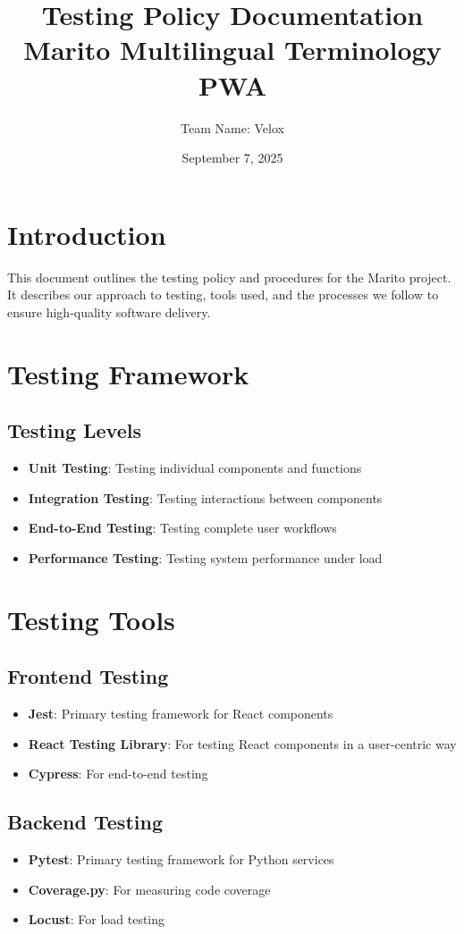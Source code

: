 \documentclass[12pt]{article}
\title{Testing Policy Documentation\\\large\textbf{Marito Multilingual Terminology PWA}}
\author{Team Name: Velox}
\date{September 7, 2025}
\begin{document}
\maketitle
\tableofcontents
\newpage

\section{Introduction}
This document outlines the testing policy and procedures for the Marito project. It describes our approach to testing, tools used, and the processes we follow to ensure high-quality software delivery.

\section{Testing Framework}

\subsection{Testing Levels}
\begin{itemize}
    \item \textbf{Unit Testing}: Testing individual components and functions
    \item \textbf{Integration Testing}: Testing interactions between components
    \item \textbf{End-to-End Testing}: Testing complete user workflows
    \item \textbf{Performance Testing}: Testing system performance under load
\end{itemize}

\section{Testing Tools}

\subsection{Frontend Testing}
\begin{itemize}
    \item \textbf{Jest}: Primary testing framework for React components
    \item \textbf{React Testing Library}: For testing React components in a user-centric way
    \item \textbf{Cypress}: For end-to-end testing
\end{itemize}

\subsection{Backend Testing}
\begin{itemize}
    \item \textbf{Pytest}: Primary testing framework for Python services
    \item \textbf{Coverage.py}: For measuring code coverage
    \item \textbf{Locust}: For load testing
\end{itemize}
\end{document}

